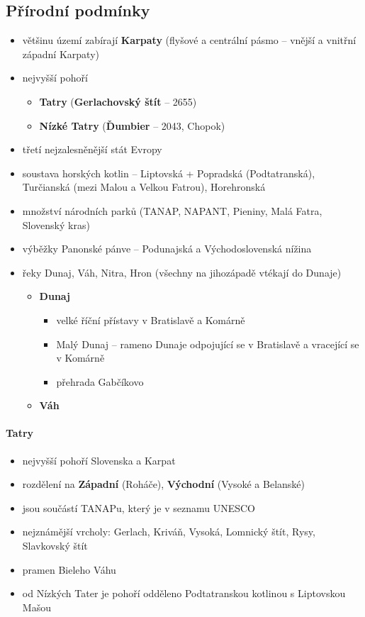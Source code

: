 \subsection{Přírodní podmínky}
\begin{itemize}
\item většinu území zabírají \textbf{Karpaty} (flyšové a centrální pásmo -- vnější a vnitřní západní Karpaty)
\item nejvyšší pohoří
\begin{itemize}
\item \textbf{Tatry} (\textbf{Gerlachovský štít} -- 2655)
\item \textbf{Nízké Tatry} (\textbf{Ďumbier} -- 2043, Chopok)
\end{itemize}
\item třetí nejzalesněnější stát Evropy
\item soustava horských kotlin -- Liptovská + Popradská (Podtatranská), Turčianská (mezi Malou a Velkou Fatrou), Horehronská
\item množství národních parků (TANAP, NAPANT, Pieniny, Malá Fatra, Slovenský kras)
\item výběžky Panonské pánve -- Podunajská a Východoslovenská nížina
\item řeky Dunaj, Váh, Nitra, Hron (všechny na jihozápadě vtékají do Dunaje)
\begin{itemize}
\item \textbf{Dunaj}
\begin{itemize}
\item velké říční přístavy v Bratislavě a Komárně
\item Malý Dunaj -- rameno Dunaje odpojující se v Bratislavě a vracející se v Komárně
\item přehrada Gabčíkovo
\end{itemize}
\item \textbf{Váh}
\end{itemize}
\end{itemize}


\paragraph{Tatry}
\begin{itemize}
\item nejvyšší pohoří Slovenska a Karpat
\item rozdělení na \textbf{Západní} (Roháče), \textbf{Východní} (Vysoké a Belanské)
\item jsou součástí TANAPu, který je v seznamu UNESCO
\item nejznámější vrcholy: Gerlach, Kriváň, Vysoká, Lomnický štít, Rysy, Slavkovský štít
\item pramen Bieleho Váhu
\item od Nízkých Tater je pohoří odděleno Podtatranskou kotlinou s Liptovskou Mašou
\end{itemize}


